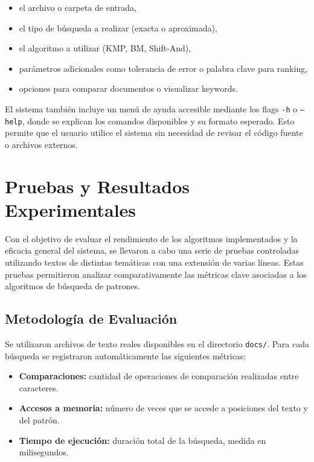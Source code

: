 \documentclass[9pt,letterpaper,onecolumn]{rho-class/rho}
\begin{document}
\begin{itemize}
    \item el archivo o carpeta de entrada,
    \item el tipo de búsqueda a realizar (exacta o aproximada),
    \item el algoritmo a utilizar (KMP, BM, Shift-And),
    \item parámetros adicionales como tolerancia de error o palabra clave para ranking,
    \item opciones para comparar documentos o visualizar keywords.
\end{itemize}

El sistema también incluye un menú de ayuda accesible mediante los flags \texttt{-h} o \texttt{--help}, donde se explican los comandos disponibles y su formato esperado. Esto permite que el usuario utilice el sistema sin necesidad de revisar el código fuente o archivos externos.




\section{Pruebas y Resultados Experimentales}
\label{sec:experimentos}

Con el objetivo de evaluar el rendimiento de los algoritmos implementados y la eficacia general del sistema, se llevaron a cabo una serie de pruebas controladas utilizando textos de distintas temáticas con una extensión de varias líneas. Estas pruebas permitieron analizar comparativamente las métricas clave asociadas a los algoritmos de búsqueda de patrones.

\subsection{Metodología de Evaluación}

Se utilizaron archivos de texto reales disponibles en el directorio \texttt{docs/}. Para cada búsqueda se registraron automáticamente las siguientes métricas:

\begin{itemize}
    \item \textbf{Comparaciones:} cantidad de operaciones de comparación realizadas entre caracteres.
    \item \textbf{Accesos a memoria:} número de veces que se accede a posiciones del texto y del patrón.
    \item \textbf{Tiempo de ejecución:} duración total de la búsqueda, medida en milisegundos.
\end{itemize}
\end{document}
